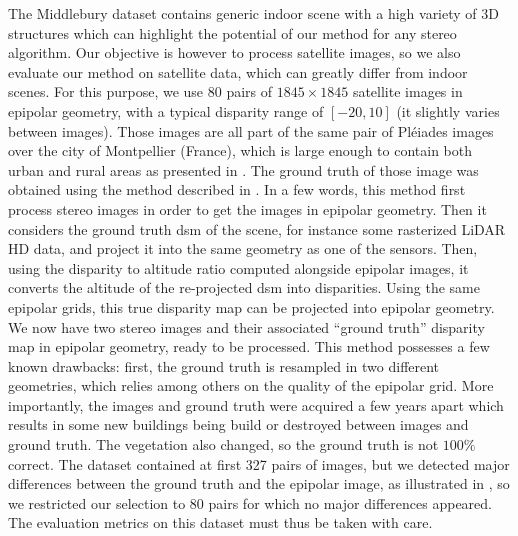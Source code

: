 The Middlebury dataset contains generic indoor scene with a high variety of 3D structures which can highlight the potential of our method for any stereo algorithm. Our objective is however to process satellite images, so we also evaluate our method on satellite data, which can greatly differ from indoor scenes. For this purpose, we use 80 pairs of $1845\times1845$ satellite images in epipolar geometry, with a typical disparity range of $[-20, 10]$ (it slightly varies between images). Those images are all part of the same pair of Pléiades images over the city of Montpellier (France), which is large enough to contain both urban and rural areas as presented in . The ground truth of those image was obtained using the method described in \cite{cournet_ground_2020}. In a few words, this method first process stereo images in order to get the images in epipolar geometry. Then it considers the ground truth \acrshort{dsm} of the scene, for instance some rasterized LiDAR HD data, and project it into the same geometry as one of the sensors. Then, using the disparity to altitude ratio computed alongside epipolar images, it converts the altitude of the re-projected \acrshort{dsm} into disparities. Using the same epipolar grids, this true disparity map can be projected into epipolar geometry. We now have two stereo images and their associated ``ground truth'' disparity map in epipolar geometry, ready to be processed. This method possesses a few known drawbacks: first, the ground truth is resampled in two different geometries, which relies among others on the quality of the epipolar grid. More importantly, the images and ground truth were acquired a few years apart which results in some new buildings being build or destroyed between images and ground truth. The vegetation also changed, so the ground truth is not $100\%$ correct. The dataset contained at first 327 pairs of images, but we detected major differences between the ground truth and the epipolar image, as illustrated in , so we restricted our selection to 80 pairs for which no major differences appeared. The evaluation metrics on this dataset must thus be taken with care.

